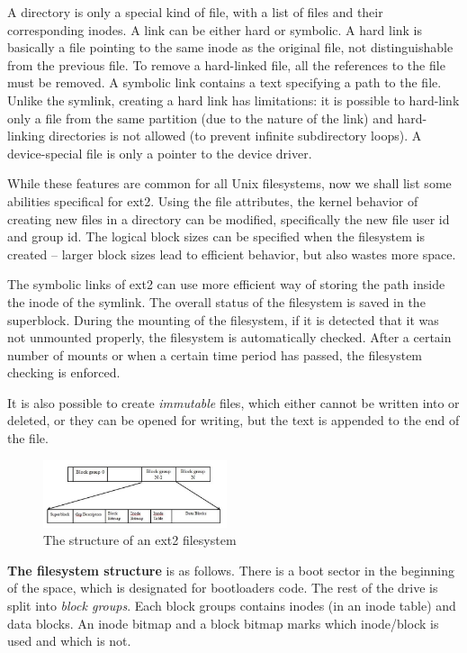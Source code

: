 \documentclass{acm_proc_article-sp}
\begin{document}
A directory is only a special kind of file, with a list of files and their corresponding inodes. A link can be either hard or symbolic. A hard link is basically a file pointing to the same inode as the original file, not distinguishable from the previous file. To remove a hard-linked file, all the references to the file must be removed. A symbolic link contains a text specifying a path to the file. Unlike the symlink, creating a hard link has limitations: it is possible to hard-link only a file from the same partition (due to the nature of the link) and hard-linking directories is not allowed (to prevent infinite subdirectory loops). A device-special file is only a pointer to the device driver.

While these features are common for all Unix filesystems, now we shall list some abilities specifical for ext2. Using the file attributes, the kernel behavior of creating new files in a directory can be modified, specifically the new file user id and group id. The logical block sizes can be specified when the filesystem is created -- larger block sizes lead to efficient behavior, but also wastes more space.

The symbolic links of ext2 can use more efficient way of storing the path inside the inode of the symlink. The overall status of the filesystem is saved in the superblock. During the mounting of the filesystem, if it is detected that it was not unmounted properly, the filesystem is automatically checked. After a certain number of mounts or when a certain time period has passed, the filesystem checking is enforced.

It is also possible to create {\it immutable} files, which either cannot be written into or deleted, or they can be opened for writing, but the text is appended to the end of the file.

\begin{figure}
\centering
\includegraphics[width=0.48\textwidth]{images/ext2structure.jpg}
	\caption{The structure of an ext2 filesystem \cite{ext2structure}}
\end{figure}

{\bf The filesystem structure} is as follows. There is a boot sector in the beginning of the space, which is designated for bootloaders code. The rest of the drive is split into {\it block groups}. Each block groups contains inodes (in an inode table) and data blocks. An inode bitmap and a block bitmap marks which inode/block is used and which is not. 
\end{document}
